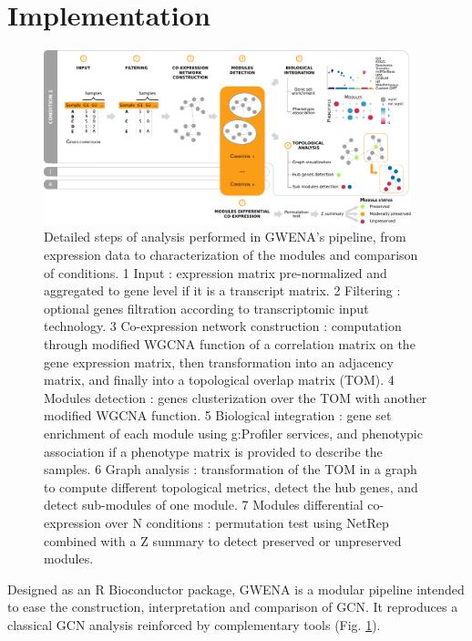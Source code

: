 \section{Implementation}

\begin{figure}[ht]
    \centering
    \includegraphics[width=0.95\textwidth]{img/chap1/figure_1.pdf}
    \caption[Detailed steps of analysis performed in GWENA's pipeline]{Detailed steps of analysis performed in GWENA's pipeline, from expression data to characterization of the modules and comparison of conditions. \textcircled{\small{1}} Input : expression matrix pre-normalized and aggregated to gene level if it is a transcript matrix. \textcircled{\small{2}} Filtering : optional genes filtration according to transcriptomic input technology. \textcircled{\small{3}} Co-expression network construction : computation through modified WGCNA function of a correlation matrix on the gene expression matrix, then transformation into an adjacency matrix, and finally into a topological overlap matrix (TOM). \textcircled{\small{4}} Modules detection : genes clusterization over the TOM with another modified WGCNA function. \textcircled{\small{5}} Biological integration : gene set enrichment of each module using g:Profiler services, and phenotypic association if a phenotype matrix is provided to describe the samples. \textcircled{\small{6}} Graph analysis : transformation of the TOM in a graph to compute different topological metrics, detect the hub genes, and detect sub-modules of one module. \textcircled{\small{7}} Modules differential co-expression over N conditions : permutation test using NetRep combined with a Z summary to detect preserved or unpreserved modules.} 
    \label{fig:fig_pipeline_schema}
\end{figure}


Designed as an R Bioconductor package, GWENA is a modular pipeline intended to ease the construction, interpretation and comparison of GCN. It reproduces a classical GCN analysis reinforced by complementary tools (Fig. \ref{fig:fig_pipeline_schema}). 


